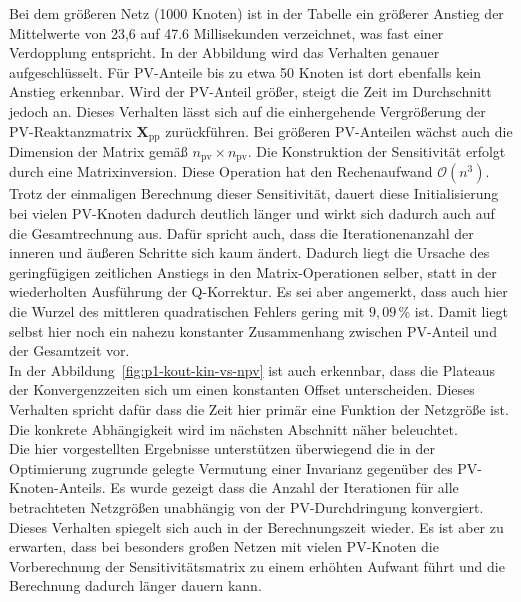 Bei dem größeren Netz (1000 Knoten) ist in der Tabelle ein größerer Anstieg der Mittelwerte von 23,6 auf 47.6 Millisekunden verzeichnet, was fast einer Verdopplung entspricht.
In der Abbildung wird das Verhalten genauer aufgeschlüsselt.
Für PV-Anteile bis zu etwa 50 Knoten ist dort ebenfalls kein Anstieg erkennbar.
Wird der PV-Anteil größer, steigt die Zeit im Durchschnitt jedoch an.
Dieses Verhalten lässt sich auf die einhergehende Vergrößerung der PV-Reaktanzmatrix $\mathbf{X}_\mathrm{pp}$ zurückführen.
Bei größeren PV-Anteilen wächst auch die Dimension der Matrix gemäß $n_\mathrm{pv} \times n_\mathrm{pv}$. 
Die Konstruktion der Sensitivität erfolgt durch eine Matrixinversion. 
Diese Operation hat den Rechenaufwand $\mathcal{O}(n^3)$.
Trotz der einmaligen Berechnung dieser Sensitivität, dauert diese Initialisierung bei vielen PV-Knoten dadurch deutlich länger und wirkt sich dadurch auch auf die Gesamtrechnung aus.
Dafür spricht auch, dass die Iterationenanzahl der inneren und äußeren Schritte sich kaum ändert.
Dadurch liegt die Ursache des geringfügigen zeitlichen Anstiegs in den Matrix-Operationen selber, statt in der wiederholten Ausführung der Q-Korrektur.
Es sei aber angemerkt, dass auch hier die Wurzel des mittleren quadratischen Fehlers gering mit $9,09\,\%$ ist.
Damit liegt selbst hier noch ein nahezu konstanter Zusammenhang zwischen PV-Anteil und der Gesamtzeit vor.\\

In der Abbildung~\ref{fig:p1-kout-kin-vs-npv} ist auch erkennbar, dass die Plateaus der Konvergenzzeiten sich um einen konstanten Offset unterscheiden.
Dieses Verhalten spricht dafür dass die Zeit hier primär eine Funktion der Netzgröße ist. 
Die konkrete Abhängigkeit wird im nächsten Abschnitt näher beleuchtet.\\

Die hier vorgestellten Ergebnisse unterstützen überwiegend die in der Optimierung zugrunde gelegte Vermutung einer Invarianz gegenüber des PV-Knoten-Anteils.
Es wurde gezeigt dass die Anzahl der Iterationen für alle betrachteten Netzgrößen unabhängig von der PV-Durchdringung konvergiert.
Dieses Verhalten spiegelt sich auch in der Berechnungszeit wieder. 
Es ist aber zu erwarten, dass bei besonders großen Netzen mit vielen PV-Knoten die Vorberechnung der Sensitivitätsmatrix zu einem erhöhten Aufwant führt und die Berechnung dadurch länger dauern kann.



